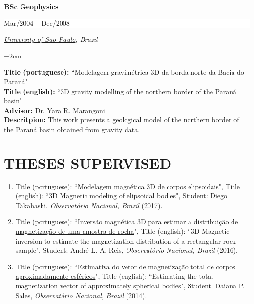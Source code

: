 \documentclass[paper=letter,fontsize=11pt]{scrartcl} %
\newcommand{\sepspace}{\vspace*{1em}}		%
\newcommand{\NewPart}[2]{\section*{\uppercase{#1} #2}}
\newcommand{\EducationEntry}[4]{
		\noindent \textbf{#1} \hfill      %
		\colorbox{White}{%
			\parbox{10em}{%
			\hfill\color{Black}#2}} \par  %
		\noindent \textit{#3} \par        %
		\noindent\hangindent=2em\hangafter=0 \small #4 %
		\normalsize \par}
\newcommand{\ThesisEntry}[6]{
		\noindent [#1] Title (portuguese): ``#2", Title (english): ``#3", Student: #4, \textit{#5} (#6).}
\begin{document}
\sepspace

\EducationEntry{\Large BSc Geophysics}{\begin{flushright} Mar/2004 -- Dec/2008 \end{flushright} \vspace{-0.2in}}{\href{http://www.iag.usp.br/international/}{University of S\~{a}o Paulo}, Brazil}

\sepspace \noindent
\textbf{Title (portuguese):} ``Modelagem gravim\'{e}trica 3D da borda norte da Bacia do Paran\'{a}" \\
\textbf{Title (english):} ``3D gravity modelling of the northern border of the Paran\'{a} basin" \\
\textbf{Advisor:} Dr. Yara R. Marangoni \\
\textbf{Descritpion:} This work presents a geological model of the northern border of the Paran\'{a} basin obtained from gravity data.

\sepspace


\renewcommand{\refname}{PEER-REVIEWED JOURNAL PAPERS (\href{http://orcid.org/0000-0002-6338-4086}{ORCID})}
\nocite{*}



\sepspace

\NewPart{Theses Supervised}{}

\begin{enumerate}

\item\ThesisEntry{MSc}{\href{http://www.pinga-lab.org/thesis/takahashi-msc.html}{Modelagem magn\'{e}tica 3D de corpos elipsoidais}}{3D Magnetic modeling of elipsoidal bodies}{Diego Takahashi}{Observat\'{o}rio Nacional, Brazil}{2017}

\item\ThesisEntry{MSc}{\href{http://www.pinga-lab.org/thesis/andre-msc.html}{Invers\~{a}o magn\'{e}tica 3D para estimar a distribui\c{c}\~{a}o de magnetiza\c{c}\~{a}o de uma amostra de rocha}}{3D Magnetic inversion to estimate the magnetization distribution of a rectangular rock sample}{Andr\'{e} L. A. Reis}{Observat\'{o}rio Nacional, Brazil}{2016}

\item\ThesisEntry{MSc}{\href{http://www.pinga-lab.org/thesis/daiana-msc.html}{Estimativa do vetor de magnetiza\c{c}\~{a}o total de corpos aproximadamente esf\'{e}ricos}}{Estimating the total magnetization vector of approximately spherical bodies}{Daiana P. Sales}{Observat\'{o}rio Nacional, Brazil}{2014}

\end{enumerate}
\end{document}
